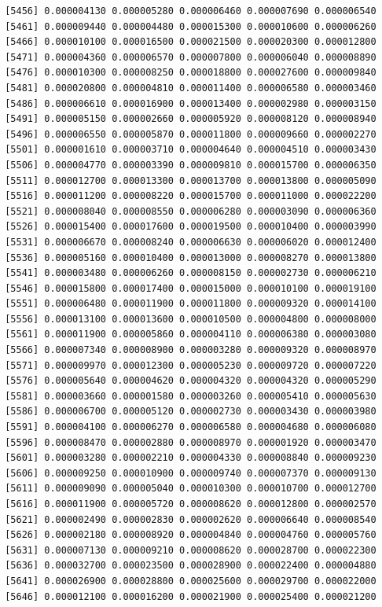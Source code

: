 \documentclass[]{article}
\begin{document}
\begin{verbatim}
 [5456] 0.000004130 0.000005280 0.000006460 0.000007690 0.000006540
 [5461] 0.000009440 0.000004480 0.000015300 0.000010600 0.000006260
 [5466] 0.000010100 0.000016500 0.000021500 0.000020300 0.000012800
 [5471] 0.000004360 0.000006570 0.000007800 0.000006040 0.000008890
 [5476] 0.000010300 0.000008250 0.000018800 0.000027600 0.000009840
 [5481] 0.000020800 0.000004810 0.000011400 0.000006580 0.000003460
 [5486] 0.000006610 0.000016900 0.000013400 0.000002980 0.000003150
 [5491] 0.000005150 0.000002660 0.000005920 0.000008120 0.000008940
 [5496] 0.000006550 0.000005870 0.000011800 0.000009660 0.000002270
 [5501] 0.000001610 0.000003710 0.000004640 0.000004510 0.000003430
 [5506] 0.000004770 0.000003390 0.000009810 0.000015700 0.000006350
 [5511] 0.000012700 0.000013300 0.000013700 0.000013800 0.000005090
 [5516] 0.000011200 0.000008220 0.000015700 0.000011000 0.000022200
 [5521] 0.000008040 0.000008550 0.000006280 0.000003090 0.000006360
 [5526] 0.000015400 0.000017600 0.000019500 0.000010400 0.000003990
 [5531] 0.000006670 0.000008240 0.000006630 0.000006020 0.000012400
 [5536] 0.000005160 0.000010400 0.000013000 0.000008270 0.000013800
 [5541] 0.000003480 0.000006260 0.000008150 0.000002730 0.000006210
 [5546] 0.000015800 0.000017400 0.000015000 0.000010100 0.000019100
 [5551] 0.000006480 0.000011900 0.000011800 0.000009320 0.000014100
 [5556] 0.000013100 0.000013600 0.000010500 0.000004800 0.000008000
 [5561] 0.000011900 0.000005860 0.000004110 0.000006380 0.000003080
 [5566] 0.000007340 0.000008900 0.000003280 0.000009320 0.000008970
 [5571] 0.000009970 0.000012300 0.000005230 0.000009720 0.000007220
 [5576] 0.000005640 0.000004620 0.000004320 0.000004320 0.000005290
 [5581] 0.000003660 0.000001580 0.000003260 0.000005410 0.000005630
 [5586] 0.000006700 0.000005120 0.000002730 0.000003430 0.000003980
 [5591] 0.000004100 0.000006270 0.000006580 0.000004680 0.000006080
 [5596] 0.000008470 0.000002880 0.000008970 0.000001920 0.000003470
 [5601] 0.000003280 0.000002210 0.000004330 0.000008840 0.000009230
 [5606] 0.000009250 0.000010900 0.000009740 0.000007370 0.000009130
 [5611] 0.000009090 0.000005040 0.000010300 0.000010700 0.000012700
 [5616] 0.000011900 0.000005720 0.000008620 0.000012800 0.000002570
 [5621] 0.000002490 0.000002830 0.000002620 0.000006640 0.000008540
 [5626] 0.000002180 0.000008920 0.000004840 0.000004760 0.000005760
 [5631] 0.000007130 0.000009210 0.000008620 0.000028700 0.000022300
 [5636] 0.000032700 0.000023500 0.000028900 0.000022400 0.000004880
 [5641] 0.000026900 0.000028800 0.000025600 0.000029700 0.000022000
 [5646] 0.000012100 0.000016200 0.000021900 0.000025400 0.000021200

\end{verbatim}
\end{document}

